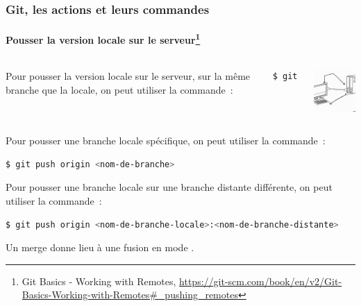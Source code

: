 \documentclass{beamer}
\begin{document}
    \begin{frame}[fragile]
        \frametitle{Git, les actions et leurs commandes}
        \framesubtitle{Pousser la version locale sur le serveur\footnote{\label{progitpushing}Git Basics - Working with Remotes, \url{https://git-scm.com/book/en/v2/Git-Basics-Working-with-Remotes\#_pushing_remotes}}}
        \transdissolve


        \begin{columns}
            Pour pousser la version locale sur le serveur, sur la même branche que la locale, on peut utiliser la commande~:
            \begin{lstlisting}[language=sh]
$ git push
            \end{lstlisting}
            \centering
            \begin{center}
                \includegraphics[width=3cm]{image/schematic-drawing-of-a-computer-linked-to-a-remote-server.png}
            \end{center}
        \end{columns}

        Pour pousser une branche locale spécifique, on peut utiliser la commande~:
        \begin{lstlisting}[language=sh]
$ git push origin <nom-de-branche>
        \end{lstlisting}
        Pour pousser une branche locale sur une branche distante différente, on peut utiliser la commande~:
        \begin{lstlisting}[language=sh]
$ git push origin <nom-de-branche-locale>:<nom-de-branche-distante>
        \end{lstlisting}

        Un merge donne lieu à une fusion en mode .
    \end{frame}
\end{document}

